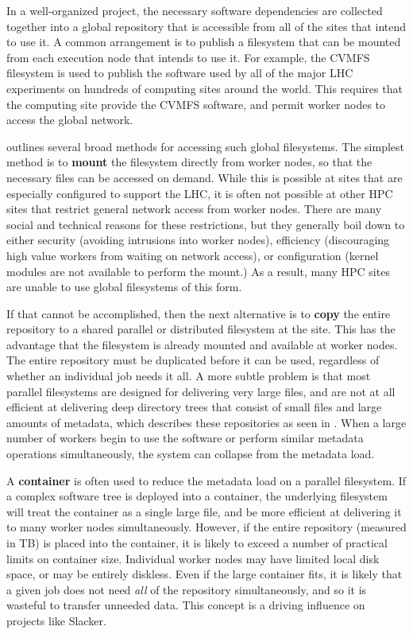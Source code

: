 \documentclass[sigconf]{acmart}
\begin{document}
In a well-organized project, the necessary software dependencies
are collected together into a global repository that is accessible
from all of the sites that intend to use it.  A common arrangement
is to publish a filesystem that can be mounted from each execution node that intends to use it.  For example, the CVMFS~\cite{globalfs-cise-2015} filesystem is used to publish the software used by all of the major LHC
experiments on hundreds of computing sites around the world.
This requires that the computing site provide the CVMFS software,
and permit worker nodes to access the global network.

 outlines several broad methods for
accessing such global filesystems.  The simplest
method is to {\bf mount} the filesystem directly from worker
nodes, so that the necessary files can be accessed on demand.
While this is possible at sites that are especially configured
to support the LHC, it is often not possible at other HPC sites
that restrict general network access from worker nodes.
There are many social and technical reasons for these restrictions, but they generally boil down to either security (avoiding intrusions into worker nodes), efficiency (discouraging high value workers from waiting on network access), or configuration (kernel modules are not available to perform the mount.)  As a result, many HPC sites are unable
to use global filesystems of this form.

If that cannot be accomplished, then the next
alternative is to {\bf copy} the entire repository to
a shared parallel or distributed filesystem at the site.
This has the advantage that the filesystem is already
mounted and available at worker nodes.  The entire
repository must be duplicated before it can be used,
regardless of whether an individual job needs it all.
A more subtle problem is that most parallel filesystems are
designed for delivering very large files, and are not at all 
efficient at delivering deep directory trees that
consist of small files and large amounts of metadata,
which describes these repositories as seen in .
When a large number of workers begin to use the software or perform similar metadata operations
simultaneously, the system can collapse from the metadata
load.~\cite{metafs-pdsw-2017,spindle,torrent,exa}

A {\bf container} is often used to reduce the metadata load
on a parallel filesystem.  If a complex software tree is
deployed into a container, the underlying filesystem will
treat the container as a single large file, and be more
efficient at delivering it to many worker nodes simultaneously.
However, if the entire repository (measured in TB) is placed into
the container, it is likely to exceed a number of practical
limits on container size.  Individual worker nodes may have limited
local disk space, or may be entirely diskless.  Even if the
large container fits, it is likely that a given job does not need
\emph{all} of the repository simultaneously, and so it is wasteful
to transfer unneeded data.
This concept is a driving influence on projects like Slacker\cite{194430}.
\end{document}
